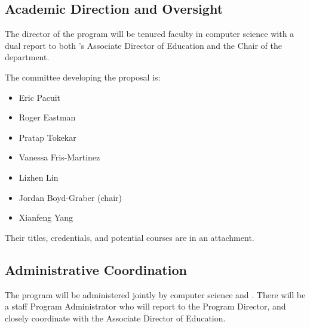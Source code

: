 
\subsection{Academic Direction and Oversight}

The director of the program will be tenured faculty in computer
science with a dual report to both \aim{}'s Associate Director of
Education and the Chair of the  department.

The committee developing the proposal is:
\begin{itemize}
    \item Eric Pacuit
    \item Roger Eastman
    \item Pratap Tokekar
    \item Vanessa Fris-Martinez
    \item Lizhen Lin
    \item Jordan Boyd-Graber (chair)
    \item Xianfeng Yang
\end{itemize}

Their titles, credentials, and potential courses are in an attachment.

\subsection{Administrative Coordination}


The program will be administered jointly by computer science and \aim{}. There will be a staff Program Administrator who will report to the Program Director, and closely coordinate with the \aim{} Associate Director of Education.